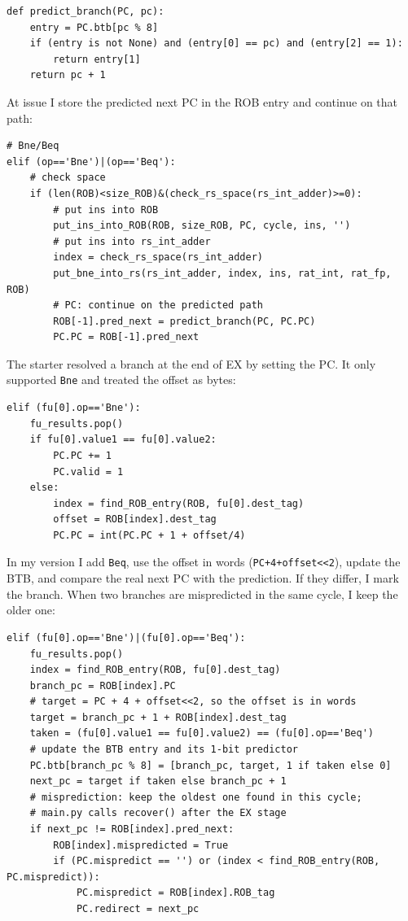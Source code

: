 \documentclass[11pt]{article}
\renewcommand{\_}{\origunderscore\allowbreak}
\begin{document}
\begin{lstlisting}
def predict_branch(PC, pc):
    entry = PC.btb[pc % 8]
    if (entry is not None) and (entry[0] == pc) and (entry[2] == 1):
        return entry[1]
    return pc + 1
\end{lstlisting}

At issue I store the predicted next PC in the ROB entry and continue on that path:

\begin{lstlisting}
# Bne/Beq 
elif (op=='Bne')|(op=='Beq'):
    # check space
    if (len(ROB)<size_ROB)&(check_rs_space(rs_int_adder)>=0):
        # put ins into ROB
        put_ins_into_ROB(ROB, size_ROB, PC, cycle, ins, '')
        # put ins into rs_int_adder
        index = check_rs_space(rs_int_adder)
        put_bne_into_rs(rs_int_adder, index, ins, rat_int, rat_fp, ROB)
        # PC: continue on the predicted path
        ROB[-1].pred_next = predict_branch(PC, PC.PC)
        PC.PC = ROB[-1].pred_next
\end{lstlisting}

The starter resolved a branch at the end of EX by setting the PC. It only supported
\texttt{Bne} and treated the offset as bytes:

\begin{lstlisting}
elif (fu[0].op=='Bne'):
    fu_results.pop()
    if fu[0].value1 == fu[0].value2:
        PC.PC += 1
        PC.valid = 1
    else:
        index = find_ROB_entry(ROB, fu[0].dest_tag)
        offset = ROB[index].dest_tag
        PC.PC = int(PC.PC + 1 + offset/4)
\end{lstlisting}

In my version I add \texttt{Beq}, use the offset in words (\texttt{PC+4+offset<<2}), update the
BTB, and compare the real next PC with the prediction. If they differ, I mark the branch. When
two branches are mispredicted in the same cycle, I keep the older one:

\begin{lstlisting}
elif (fu[0].op=='Bne')|(fu[0].op=='Beq'):
    fu_results.pop()
    index = find_ROB_entry(ROB, fu[0].dest_tag)
    branch_pc = ROB[index].PC
    # target = PC + 4 + offset<<2, so the offset is in words
    target = branch_pc + 1 + ROB[index].dest_tag
    taken = (fu[0].value1 == fu[0].value2) == (fu[0].op=='Beq')
    # update the BTB entry and its 1-bit predictor
    PC.btb[branch_pc % 8] = [branch_pc, target, 1 if taken else 0]
    next_pc = target if taken else branch_pc + 1
    # misprediction: keep the oldest one found in this cycle;
    # main.py calls recover() after the EX stage
    if next_pc != ROB[index].pred_next:
        ROB[index].mispredicted = True
        if (PC.mispredict == '') or (index < find_ROB_entry(ROB, PC.mispredict)):
            PC.mispredict = ROB[index].ROB_tag
            PC.redirect = next_pc
\end{lstlisting}
\end{document}
